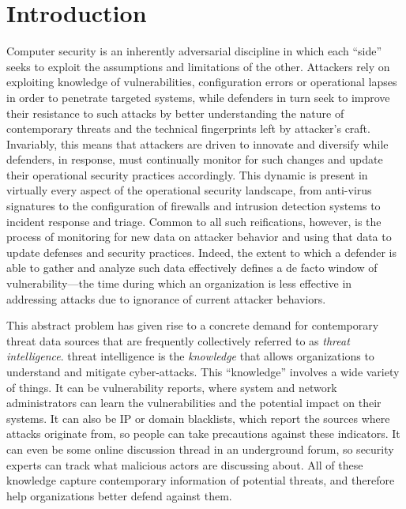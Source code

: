 \chapter{Introduction}
\label{chapter:introduction}

Computer security is an inherently adversarial discipline in which
each ``side'' seeks to exploit the assumptions and limitations of the
other.  Attackers rely on exploiting knowledge of vulnerabilities,
configuration errors or operational lapses in order to penetrate
targeted systems, while defenders in turn seek to improve their
resistance to such attacks by better understanding the nature of
contemporary threats and the technical fingerprints left by attacker's
craft.  Invariably, this means that attackers are driven to innovate
and diversify while defenders, in response, must continually monitor
for such changes and update their operational security practices
accordingly.  This dynamic is present in virtually every aspect of the
operational security landscape, from anti-virus signatures to the
configuration of firewalls and intrusion detection systems to incident
response and triage.  Common to all such reifications, however, is the
process of monitoring for new data on attacker behavior and using that
data to update defenses and security practices. Indeed, the extent to
which a defender is able to gather and analyze such data effectively
defines a de facto window of vulnerability---the time during which an
organization is less effective in addressing attacks due to ignorance
of current attacker behaviors.

This abstract problem has given rise to a concrete demand for
contemporary threat data sources that are frequently collectively
referred to as \emph{threat intelligence}. threat intelligence 
is the \emph{knowledge} that allows organizations to understand and 
mitigate cyber-attacks. This ``knowledge'' involves a wide variety 
of things. It can be vulnerability reports, where system and 
network administrators can learn the vulnerabilities and the potential
impact on their systems. It can also be IP or domain blacklists,
which report the sources where attacks originate from, so people
can take precautions against these indicators. It can even be some 
online discussion thread in an underground forum, so security 
experts can track what malicious actors are discussing about. 
All of these knowledge capture contemporary information of potential 
threats, and therefore help organizations better defend 
against them.

